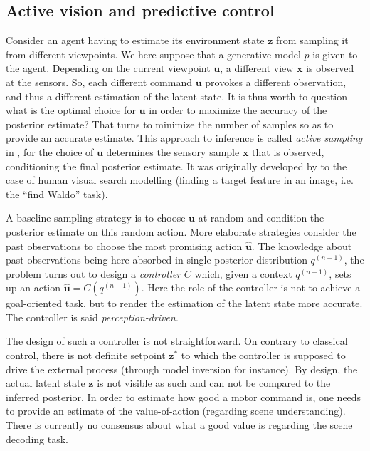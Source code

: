 \documentclass[12pt,twoside,openright]{article}
\begin{document}
\subsection{Active vision and predictive control}\label{sec:perception-driven-control}


Consider an agent having to estimate its environment state $\boldsymbol{z}$ from sampling it from different viewpoints. We here suppose that a generative model $p$ is given to the agent. 
Depending on  the current viewpoint $\boldsymbol{u}$, a different view $\boldsymbol{x}$ is observed at the sensors. So, each different command $\boldsymbol{u}$ provokes a different observation, and thus a different 
estimation of the latent state. It is thus worth to question what is the optimal choice for $\boldsymbol{u}$ in order to maximize the accuracy of the posterior estimate?
That turns  to minimize the number of samples so as to provide an accurate estimate. This approach to inference is called \emph{active sampling} in \citet{friston2012perceptions}, for the choice of $\boldsymbol{u}$ determines the sensory sample $\boldsymbol{x}$ that is observed, conditioning the final posterior estimate. {\color{Purple} It was originally developed by \citet{najemnik2005optimal} to the case of human visual search modelling (finding a target feature in an image, i.e. the ``find Waldo'' task).}

A baseline sampling strategy is to choose $\boldsymbol{u}$ at random and condition the posterior  estimate on this random action. 
More elaborate strategies consider the past observations
to choose the most promising action $\hat{\boldsymbol{u}}$. 
The knowledge about past observations being here absorbed in single posterior distribution $q^{(n-1)}$, the problem turns out to design  a \emph{controller} $C$ which, given a context $q^{(n-1)}$, sets up an action $\hat{\boldsymbol{u}} = C(q^{(n-1)})$. Here the role of the controller is not to achieve a goal-oriented task, but to render the estimation of the latent state more accurate. The controller is said \emph{perception-driven}. 

The design of such a controller is not straightforward. On contrary to classical control, there is not definite setpoint $\boldsymbol{z}^*$ to which the controller is supposed to drive the external process (through model inversion for instance). By design, the actual latent state $\boldsymbol{z}$ is not visible as such and can not be compared to the inferred posterior. In order to estimate how good a motor command is, one needs to provide an estimate of the value-of-action (regarding scene understanding). There is currently no consensus about what a good value is regarding the scene decoding task. 
\end{document}
